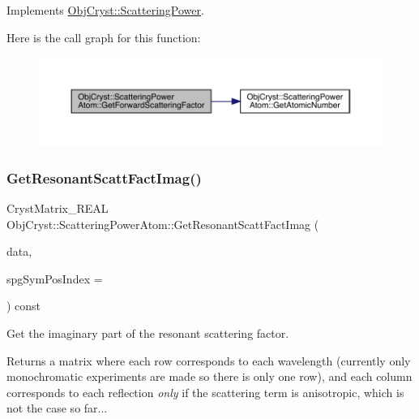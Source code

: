Implements \mbox{\hyperlink{class_obj_cryst_1_1_scattering_power_a854b51b9b08e96af0fe7986fe372c50c}{Obj\+Cryst\+::\+Scattering\+Power}}.

Here is the call graph for this function\+:
\nopagebreak
\begin{figure}[H]
\begin{center}
\leavevmode
\includegraphics[width=350pt]{class_obj_cryst_1_1_scattering_power_atom_abe4d6e3b47759d143b5686abf490744f_cgraph}
\end{center}
\end{figure}
\mbox{\label{class_obj_cryst_1_1_scattering_power_atom_a42db6378fdd8e3fbfae31b3f4dd5bb17}} 
\subsubsection{\texorpdfstring{GetResonantScattFactImag()}{GetResonantScattFactImag()}}
{\footnotesize\ttfamily Cryst\+Matrix\+\_\+\+R\+E\+AL Obj\+Cryst\+::\+Scattering\+Power\+Atom\+::\+Get\+Resonant\+Scatt\+Fact\+Imag (\begin{DoxyParamCaption}\item[{const \mbox{\hyperlink{class_obj_cryst_1_1_scattering_data}{Scattering\+Data}} \&}]{data,  }\item[{const int}]{spg\+Sym\+Pos\+Index = {} }\end{DoxyParamCaption}) const\hspace{0.3cm}{\ttfamily [virtual]}}



Get the imaginary part of the resonant scattering factor. 

\begin{DoxyReturn}{Returns}
a matrix where each row corresponds to each wavelength (currently only monochromatic experiments are made so there is only one row), and each column corresponds to each reflection {\itshape only} if the scattering term is anisotropic, which is not the case so far... 
\end{DoxyReturn}

